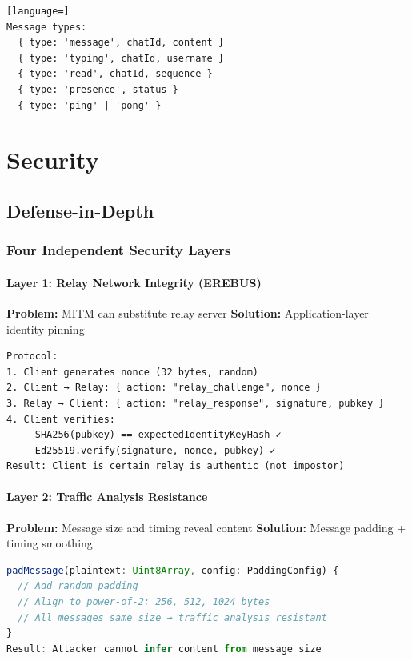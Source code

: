 \documentclass[11pt,a4paper,oneside]{book}
\begin{document}
\begin{lstlisting}[language=]
Message types:
  { type: 'message', chatId, content }
  { type: 'typing', chatId, username }
  { type: 'read', chatId, sequence }
  { type: 'presence', status }
  { type: 'ping' | 'pong' }
\end{lstlisting}
\vspace{-1cm}\part{Security}
\vspace{-0.5cm}\chapter{Defense-in-Depth}
\vspace{-0.3cm}\section{Four Independent Security Layers}
\vspace{-0.2cm}\subsection{Layer 1: Relay Network Integrity (EREBUS)}
\textbf{Problem:} MITM can substitute relay server
\textbf{Solution:} Application-layer identity pinning
\begin{verbatim}
Protocol:
1. Client generates nonce (32 bytes, random)
2. Client → Relay: { action: "relay_challenge", nonce }
3. Relay → Client: { action: "relay_response", signature, pubkey }
4. Client verifies:
   - SHA256(pubkey) == expectedIdentityKeyHash ✓
   - Ed25519.verify(signature, nonce, pubkey) ✓
Result: Client is certain relay is authentic (not impostor)
\end{verbatim}
\vspace{-0.2cm}\subsection{Layer 2: Traffic Analysis Resistance}
\textbf{Problem:} Message size and timing reveal content
\textbf{Solution:} Message padding + timing smoothing
\begin{lstlisting}[language=TypeScript]
padMessage(plaintext: Uint8Array, config: PaddingConfig) {
  // Add random padding
  // Align to power-of-2: 256, 512, 1024 bytes
  // All messages same size → traffic analysis resistant
}
Result: Attacker cannot infer content from message size
\end{lstlisting}
\end{document}
